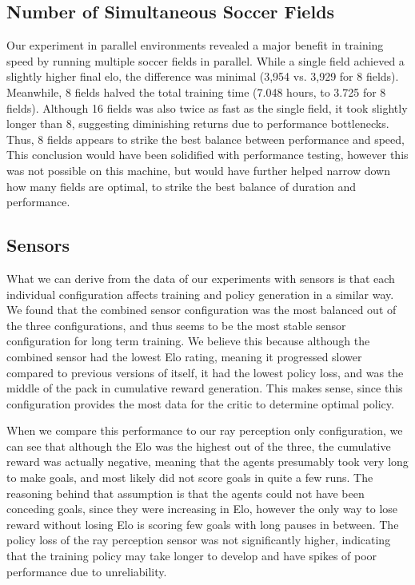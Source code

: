 \documentclass{LSkill}
\begin{document}
\subsection{Number of Simultaneous Soccer Fields}
Our experiment in parallel environments revealed a major benefit in training speed by running multiple soccer fields in parallel. While a single field achieved a slightly higher final elo, the difference was minimal (3,954 vs. 3,929 for 8 fields). Meanwhile, 8 fields halved the total training time (7.048 hours, to 3.725 for 8 fields). Although 16 fields was also twice as fast as the single field, it took slightly longer than 8, suggesting diminishing returns due to performance bottlenecks. Thus, 8 fields appears to strike the best balance between performance and speed, This conclusion would have been solidified with performance testing, however this was not possible on this machine, but would have further helped narrow down how many fields are optimal, to strike the best balance of duration and performance.

\subsection{Sensors}

What we can derive from the data of our experiments with sensors is that each individual configuration affects training and policy generation in a similar way. We found that the combined sensor configuration was the most balanced out of the three configurations, and thus seems to be the most stable sensor configuration for long term training. We believe this because although the combined sensor had the lowest Elo rating, meaning it progressed slower compared to previous versions of itself, it had the lowest policy loss, and was the middle of the pack in cumulative reward generation. This makes sense, since this configuration provides the most data for the critic to determine optimal policy. 

When we compare this performance to our ray perception only configuration, we can see that although the Elo was the highest out of the three, the cumulative reward was actually negative, meaning that the agents presumably took very long to make goals, and most likely did not score goals in quite a few runs. The reasoning behind that assumption is that the agents could not have been conceding goals, since they were increasing in Elo, however the only way to lose reward without losing Elo is scoring few goals with long pauses in between. The policy loss of the ray perception sensor was not significantly higher, indicating that the training policy may take longer to develop and have spikes of poor performance due to unreliability. 
\end{document}
